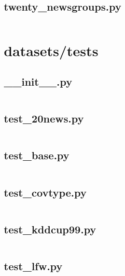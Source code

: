 \documentclass{article}
\begin{document}
\subsection{twenty\_newsgroups.py}
\inputminted{python}{/home/dufferzafar/dev/@clones/scikit-learn/sklearn/datasets/twenty_newsgroups.py}
\newpage

\section{datasets/tests}

\subsection{\_\_init\_\_.py}
\inputminted{python}{/home/dufferzafar/dev/@clones/scikit-learn/sklearn/datasets/tests/__init__.py}
\newpage

\subsection{test\_20news.py}
\inputminted{python}{/home/dufferzafar/dev/@clones/scikit-learn/sklearn/datasets/tests/test_20news.py}
\newpage

\subsection{test\_base.py}
\inputminted{python}{/home/dufferzafar/dev/@clones/scikit-learn/sklearn/datasets/tests/test_base.py}
\newpage

\subsection{test\_covtype.py}
\inputminted{python}{/home/dufferzafar/dev/@clones/scikit-learn/sklearn/datasets/tests/test_covtype.py}
\newpage

\subsection{test\_kddcup99.py}
\inputminted{python}{/home/dufferzafar/dev/@clones/scikit-learn/sklearn/datasets/tests/test_kddcup99.py}
\newpage

\subsection{test\_lfw.py}
\inputminted{python}{/home/dufferzafar/dev/@clones/scikit-learn/sklearn/datasets/tests/test_lfw.py}
\newpage
\end{document}
